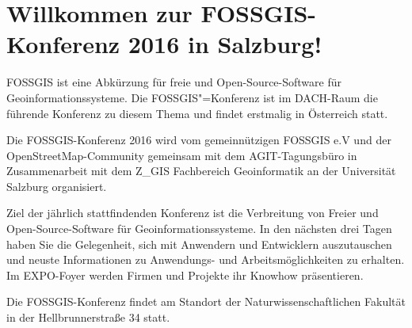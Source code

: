\newpage
\section*{Willkommen zur FOSSGIS-Konferenz 2016 in Salzburg!} \label{welcome}
FOSSGIS ist eine Abkürzung für freie und Open-Source-Software für Geoinformationssysteme.
Die FOSSGIS"=Konferenz ist im DACH-Raum die führende Konferenz zu diesem Thema und findet erstmalig in Österreich statt.

Die FOSSGIS-Konferenz 2016 wird vom gemeinnützigen FOSSGIS e.V und der OpenStreetMap-Community gemeinsam
mit dem AGIT-Tagungsbüro in Zusammenarbeit mit dem Z\_GIS Fachbereich Geoinformatik an der Universität Salzburg organisiert.

Ziel der jährlich stattfindenden Konferenz ist die Verbreitung von Freier und Open-Source-Software für Geoinformationssysteme.
In den nächsten drei Tagen haben Sie die Gelegenheit, sich mit Anwendern und Entwicklern auszutauschen
und neuste Informationen zu An\-wen\-dungs- und Arbeitsmöglichkeiten zu erhalten. Im EXPO-Foyer werden Firmen und Projekte ihr Know\-how präsentieren.

Die FOSSGIS-Konferenz findet am Standort der Naturwissenschaftlichen Fakultät in der Hellbrunnerstraße 34 statt.

\newpage
